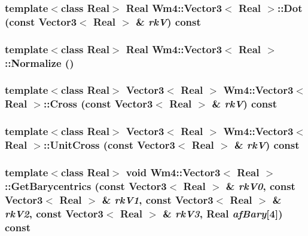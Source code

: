 \subsubsection{\setlength{\rightskip}{0pt plus 5cm}template$<$class Real$>$ Real {\bf Wm4::Vector3}$<$ Real $>$::Dot (const {\bf Vector3}$<$ Real $>$ \& {\em rk\-V}) const\hspace{0.3cm}{\tt  [inline]}}\label{classWm4_1_1Vector3_6dc2a1dd851f3d1f8dee786db35b9625}


\subsubsection{\setlength{\rightskip}{0pt plus 5cm}template$<$class Real$>$ Real {\bf Wm4::Vector3}$<$ Real $>$::Normalize ()\hspace{0.3cm}{\tt  [inline]}}\label{classWm4_1_1Vector3_67c6c5439a4e931d65aefd3146a61a4c}


\subsubsection{\setlength{\rightskip}{0pt plus 5cm}template$<$class Real$>$ {\bf Vector3}$<$ Real $>$ {\bf Wm4::Vector3}$<$ Real $>$::Cross (const {\bf Vector3}$<$ Real $>$ \& {\em rk\-V}) const\hspace{0.3cm}{\tt  [inline]}}\label{classWm4_1_1Vector3_3aecdfd8f7e168f52232399b8e146ba0}


\subsubsection{\setlength{\rightskip}{0pt plus 5cm}template$<$class Real$>$ {\bf Vector3}$<$ Real $>$ {\bf Wm4::Vector3}$<$ Real $>$::Unit\-Cross (const {\bf Vector3}$<$ Real $>$ \& {\em rk\-V}) const\hspace{0.3cm}{\tt  [inline]}}\label{classWm4_1_1Vector3_760e0d47e71eca3208faaa4790123cfe}


\subsubsection{\setlength{\rightskip}{0pt plus 5cm}template$<$class Real$>$ void {\bf Wm4::Vector3}$<$ Real $>$::Get\-Barycentrics (const {\bf Vector3}$<$ Real $>$ \& {\em rk\-V0}, const {\bf Vector3}$<$ Real $>$ \& {\em rk\-V1}, const {\bf Vector3}$<$ Real $>$ \& {\em rk\-V2}, const {\bf Vector3}$<$ Real $>$ \& {\em rk\-V3}, Real {\em af\-Bary}[4]) const}\label{classWm4_1_1Vector3_903164705e7c42dcc3040b7f53652d6d}


